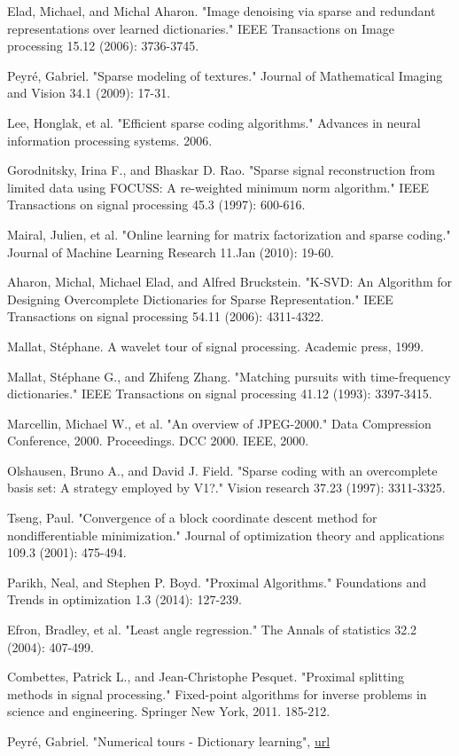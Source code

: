 \documentclass[a4paper,11pt]{article}
\begin{document}
\begin{thebibliography}{9}

Elad, Michael, and Michal Aharon. "Image denoising via sparse and redundant representations over learned dictionaries." IEEE Transactions on Image processing 15.12 (2006): 3736-3745.

Peyré, Gabriel. "Sparse modeling of textures." Journal of Mathematical Imaging and Vision 34.1 (2009): 17-31.

Lee, Honglak, et al. "Efficient sparse coding algorithms." Advances in neural information processing systems. 2006.

Gorodnitsky, Irina F., and Bhaskar D. Rao. "Sparse signal reconstruction from limited data using FOCUSS: A re-weighted minimum norm algorithm." IEEE Transactions on signal processing 45.3 (1997): 600-616.

Mairal, Julien, et al. "Online learning for matrix factorization and sparse coding." Journal of Machine Learning Research 11.Jan (2010): 19-60.

Aharon, Michal, Michael Elad, and Alfred Bruckstein. "K-SVD: An Algorithm for Designing Overcomplete Dictionaries for Sparse Representation." IEEE Transactions on signal processing 54.11 (2006): 4311-4322.

Mallat, Stéphane. A wavelet tour of signal processing. Academic press, 1999.

Mallat, Stéphane G., and Zhifeng Zhang. "Matching pursuits with time-frequency dictionaries." IEEE Transactions on signal processing 41.12 (1993): 3397-3415.

Marcellin, Michael W., et al. "An overview of JPEG-2000." Data Compression Conference, 2000. Proceedings. DCC 2000. IEEE, 2000.

Olshausen, Bruno A., and David J. Field. "Sparse coding with an overcomplete basis set: A strategy employed by V1?." Vision research 37.23 (1997): 3311-3325.

Tseng, Paul. "Convergence of a block coordinate descent method for nondifferentiable minimization." Journal of optimization theory and applications 109.3 (2001): 475-494.

Parikh, Neal, and Stephen P. Boyd. "Proximal Algorithms." Foundations and Trends in optimization 1.3 (2014): 127-239.

Efron, Bradley, et al. "Least angle regression." The Annals of statistics 32.2 (2004): 407-499.

Combettes, Patrick L., and Jean-Christophe Pesquet. "Proximal splitting methods in signal processing." Fixed-point algorithms for inverse problems in science and engineering. Springer New York, 2011. 185-212.

Peyré, Gabriel. "Numerical tours - Dictionary learning",
\href{https://github.com/gpeyre/numerical-tours/blob/master/matlab/sparsity_4_dictionary_learning.ipynb}{url}

\end{thebibliography}
\end{document}
